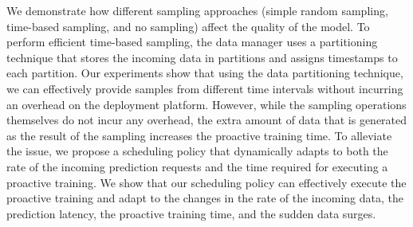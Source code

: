 We demonstrate how different sampling approaches (simple random sampling, time-based sampling, and no sampling) affect the quality of the model.
To perform efficient time-based sampling, the data manager uses a partitioning technique that stores the incoming data in partitions and assigns timestamps to each partition.
Our experiments show that using the data partitioning technique, we can effectively provide samples from different time intervals without incurring an overhead on the deployment platform.
However, while the sampling operations themselves do not incur any overhead, the extra amount of data that is generated as the result of the sampling increases the proactive training time.
To alleviate the issue, we propose a scheduling policy that dynamically adapts to both the rate of the incoming prediction requests and the time required for executing a proactive training.
We show that our scheduling policy can effectively execute the proactive training and adapt to the changes in the rate of the incoming data, the prediction latency, the proactive training time, and the sudden data surges.





